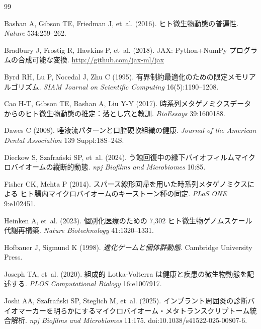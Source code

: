 \documentclass[11pt,a4paper]{article}
\begin{document}

\begin{thebibliography}{99}

Bashan A, Gibson TE, Friedman J, et~al. (2016).
ヒト微生物動態の普遍性.
\textit{Nature} 534:259--262.

Bradbury J, Frostig R, Hawkins P, et~al. (2018).
JAX: Python+NumPy プログラムの合成可能な変換.
\url{http://github.com/jax-ml/jax}

Byrd RH, Lu P, Nocedal J, Zhu C (1995).
有界制約最適化のための限定メモリアルゴリズム.
\textit{SIAM Journal on Scientific Computing} 16(5):1190--1208.

Cao H-T, Gibson TE, Bashan A, Liu Y-Y (2017).
時系列メタゲノミクスデータからのヒト微生物動態の推定：落とし穴と教訓.
\textit{BioEssays} 39:1600188.

Dawes C (2008). 唾液流パターンと口腔硬軟組織の健康.
\textit{Journal of the American Dental Association} 139 Suppl:18S--24S.

Dieckow S, Szafra\'{n}ski SP, et~al. (2024).
う蝕回復中の縁下バイオフィルムマイクロバイオームの縦断的動態.
\textit{npj Biofilms and Microbiomes} 10:85.

Fisher CK, Mehta P (2014). スパース線形回帰を用いた時系列メタゲノミクスによる
ヒト腸内マイクロバイオームのキーストーン種の同定.
\textit{PLoS ONE} 9:e102451.

Heinken A, et~al. (2023). 個別化医療のための 7,302 ヒト微生物ゲノムスケール代謝再構築.
\textit{Nature Biotechnology} 41:1320--1331.

Hofbauer J, Sigmund K (1998). \textit{進化ゲームと個体群動態}.
Cambridge University Press.

Joseph TA, et~al. (2020). 組成的 Lotka-Volterra は健康と疾患の微生物動態を記述する.
\textit{PLOS Computational Biology} 16:e1007917.

Joshi AA, Szafrański SP, Steglich M, et~al. (2025). インプラント周囲炎の診断バイオマーカーを明らかにするマイクロバイオーム・メタトランスクリプトーム統合解析.
\textit{npj Biofilms and Microbiomes} 11:175. doi:10.1038/s41522-025-00807-6.


\end{thebibliography}
\end{document}
